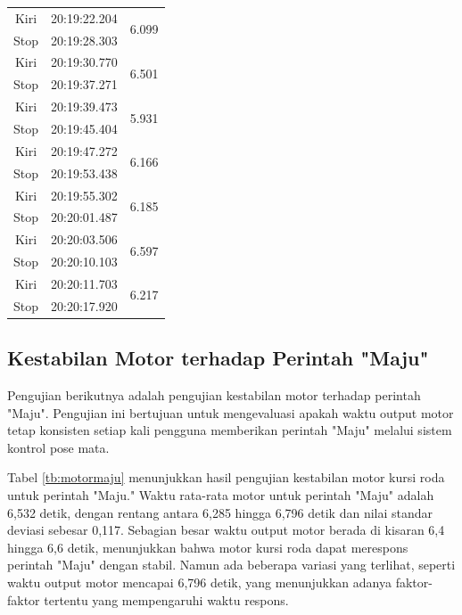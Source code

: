\begin{longtable}{|c|c|c|}
  Kiri           & 20:19:22.204        & \multirow{2}{*}{6.099}  \\ \cline{1-2}
  Stop           & 20:19:28.303        &                         \\ \hline
  Kiri           & 20:19:30.770        & \multirow{2}{*}{6.501}  \\ \cline{1-2}
  Stop           & 20:19:37.271        &                         \\ \hline
  Kiri           & 20:19:39.473        & \multirow{2}{*}{5.931}  \\ \cline{1-2}
  Stop           & 20:19:45.404        &                         \\ \hline
  Kiri           & 20:19:47.272        & \multirow{2}{*}{6.166}  \\ \cline{1-2}
  Stop           & 20:19:53.438        &                         \\ \hline
  Kiri           & 20:19:55.302        & \multirow{2}{*}{6.185}  \\ \cline{1-2}
  Stop           & 20:20:01.487        &                         \\ \hline
  Kiri           & 20:20:03.506        & \multirow{2}{*}{6.597}  \\ \cline{1-2}
  Stop           & 20:20:10.103        &                         \\ \hline
  Kiri           & 20:20:11.703        & \multirow{2}{*}{6.217}  \\ \cline{1-2}
  Stop           & 20:20:17.920        &                         \\ \hline
\end{longtable}

\subsection{Kestabilan Motor terhadap Perintah "Maju"}

Pengujian berikutnya adalah pengujian kestabilan motor terhadap perintah "Maju". Pengujian ini bertujuan untuk mengevaluasi apakah waktu output motor tetap konsisten setiap kali pengguna memberikan perintah "Maju" melalui sistem kontrol pose mata. 

Tabel \ref{tb:motormaju} menunjukkan hasil pengujian kestabilan motor kursi roda untuk perintah "Maju." Waktu rata-rata motor untuk perintah "Maju" adalah 6,532 detik, dengan rentang antara 6,285 hingga 6,796 detik dan nilai standar deviasi sebesar 0,117. Sebagian besar waktu output motor berada di kisaran 6,4 hingga 6,6 detik, menunjukkan bahwa motor kursi roda dapat merespons perintah "Maju" dengan stabil. Namun ada beberapa variasi yang terlihat, seperti waktu output motor mencapai 6,796 detik, yang menunjukkan adanya faktor-faktor tertentu yang mempengaruhi waktu respons.


